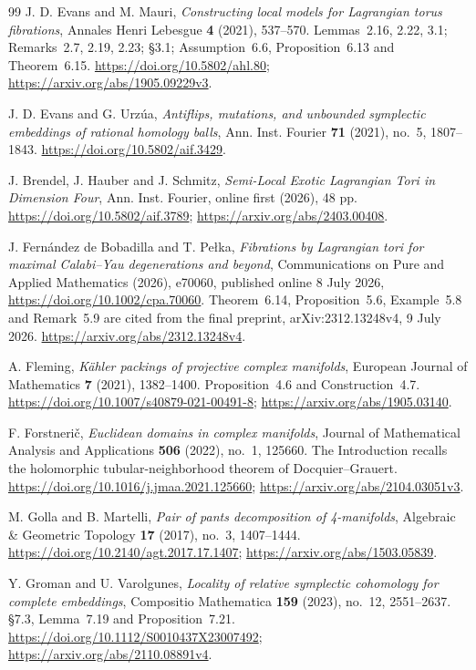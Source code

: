 \begin{thebibliography}{99}
J. D. Evans and M. Mauri,
\emph{Constructing local models for Lagrangian torus fibrations},
Annales Henri Lebesgue \textbf{4} (2021), 537--570.
Lemmas~2.16, 2.22, 3.1; Remarks~2.7, 2.19, 2.23; \S3.1;
Assumption~6.6, Proposition~6.13 and Theorem~6.15.
\url{https://doi.org/10.5802/ahl.80};
\url{https://arxiv.org/abs/1905.09229v3}.

J. D. Evans and G. Urz\'ua,
\emph{Antiflips, mutations, and unbounded symplectic embeddings of rational homology balls},
Ann. Inst. Fourier \textbf{71} (2021), no.~5, 1807--1843.
\url{https://doi.org/10.5802/aif.3429}.

J. Brendel, J. Hauber and J. Schmitz,
\emph{Semi-Local Exotic Lagrangian Tori in Dimension Four},
Ann. Inst. Fourier, online first (2026), 48 pp.
\url{https://doi.org/10.5802/aif.3789};
\url{https://arxiv.org/abs/2403.00408}.

J. Fernández de Bobadilla and T. Pełka,
\emph{Fibrations by Lagrangian tori for maximal Calabi--Yau degenerations and beyond},
Communications on Pure and Applied Mathematics (2026), e70060,
published online 8 July 2026,
\url{https://doi.org/10.1002/cpa.70060}.
Theorem~6.14, Proposition~5.6, Example~5.8 and Remark~5.9 are cited from the final preprint,
arXiv:2312.13248v4, 9 July 2026.
\url{https://arxiv.org/abs/2312.13248v4}.

A. Fleming,
\emph{Kähler packings of projective complex manifolds},
European Journal of Mathematics \textbf{7} (2021), 1382--1400.
Proposition~4.6 and Construction~4.7.
\url{https://doi.org/10.1007/s40879-021-00491-8};
\url{https://arxiv.org/abs/1905.03140}.

F. Forstnerič,
\emph{Euclidean domains in complex manifolds},
Journal of Mathematical Analysis and Applications \textbf{506} (2022), no.~1, 125660.
The Introduction recalls the holomorphic tubular-neighborhood theorem of Docquier--Grauert.
\url{https://doi.org/10.1016/j.jmaa.2021.125660};
\url{https://arxiv.org/abs/2104.03051v3}.

M. Golla and B. Martelli,
\emph{Pair of pants decomposition of 4-manifolds},
Algebraic \& Geometric Topology \textbf{17} (2017), no.~3, 1407--1444.
\url{https://doi.org/10.2140/agt.2017.17.1407};
\url{https://arxiv.org/abs/1503.05839}.

Y. Groman and U. Varolgunes,
\emph{Locality of relative symplectic cohomology for complete embeddings},
Compositio Mathematica \textbf{159} (2023), no.~12, 2551--2637.
\S7.3, Lemma~7.19 and Proposition~7.21.
\url{https://doi.org/10.1112/S0010437X23007492};
\url{https://arxiv.org/abs/2110.08891v4}.


\end{thebibliography}

